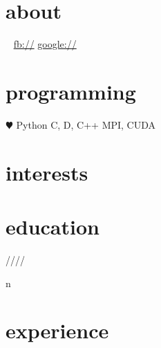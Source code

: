 \documentclass[]{fancy-cv}
\begin{document}
\header{\MakeLowercase\myfirstname}{\MakeLowercase\mylastname}

\begin{aside}
  \section{about}
    \myaddress
    \mycity
    ~
    \href{mailto:\myemail}{\myemail}
    \href{\mywebsite}{\mywebsite}
    \href{http://facebook.com/\myfb}{fb://\myfb}
    \href{http://plug.google.com/\mygp}{google://\mygp}
  \section{programming}
    {\color{red} $\varheartsuit$} Python
    C, D, C++
    MPI, CUDA
\end{aside}

\section{interests}
\MakeLowercase\interests

\section{education}
\label{sec:education}

\begin{entrylist}
 \year/\degree/\school/\city/\subtitle in \education {
  \entry{\year}{\degree}{\school}{\subtitle}
}
\end{entrylist}

\vspace{-1.5em}
\section{experience}
\label{sec:experience}

\end{document}
